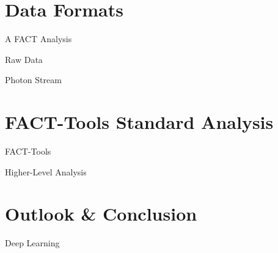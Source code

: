 \documentclass[compress, 9pt, aspectratio=1610, professionalfonts]{beamer}
\begin{document}
\section{Data Formats}
\begin{frame}[t]{A FACT Analysis}
\end{frame}

\begin{frame}[t]{Raw Data}
\end{frame}

\begin{frame}[t]{Photon Stream}
\end{frame}

\section{FACT-Tools Standard Analysis}
\begin{frame}[t]{FACT-Tools}
\end{frame}

\begin{frame}[t]{Higher-Level Analysis}
\end{frame}

\section{Outlook \& Conclusion}

\begin{frame}[t]{Deep Learning}
\end{frame}
\end{document}
